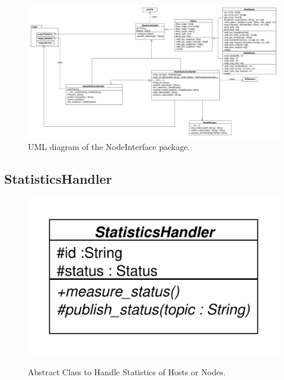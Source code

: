 
\begin{figure}[!ht]
\begin{center}
\includegraphics[width = 1.0 \linewidth]{./diagram_pictures/NodeInterface/erfassung.pdf}
\caption{UML diagram of the NodeInterface package.}
\end{center}
\end{figure}
\newpage


\subsection{StatisticsHandler}
\begin{figure}[htbp]
	\begin{minipage}[t]{7cm}
		\vspace{0pt}
		\centering
		\includegraphics[scale=0.6]{./diagram_pictures/NodeInterface/StatisticsHandler.pdf}
	\end{minipage}
	\hfill
	\begin{minipage}[t]{8cm}
		\vspace{10pt}
		Abstract Class to Handle Statistics of Hosts or Nodes.
	\end{minipage}
\end{figure}



